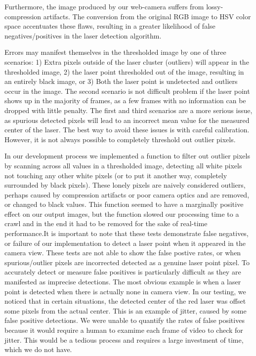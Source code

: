 \documentclass[10pt,twocolumn,letterpaper]{article}
\begin{document}
Furthermore, the image produced by our web-camera suffers from lossy-compression artifacts.  The conversion from the original RGB image to HSV color space accentuates these flaws, resulting in a greater likelihood of false negatives/positives in the laser detection algorithm.

Errors may manifest themselves in the thresholded image by one of three scenarios: 1) Extra pixels outside of the laser cluster (outliers) will appear in the thresholded image, 2) the laser point thresholded out of the image, resulting in an entirely black image, or 3) Both the laser point is undetected and outliers occur in the image.  The second scenario is not difficult problem if the laser point shows up in the majority of frames, as a few frames with no information can be dropped with little penalty.  The first and third scenarios are a more serious issue, as spurious detected pixels will lead to an incorrect mean value for the measured center of the laser.  The best way to avoid these issues is with careful calibration.  However, it is not always possible to completely threshold out outlier pixels.

In our development process we implemented a function to filter out outlier pixels by scanning across all values in a thresholded image, detecting all white pixels not touching any other white pixels (or to put it another way, completely surrounded by black pixels).  These lonely pixels are naively considered outliers, perhaps caused by compression artifacts or poor camera optics and are removed, or changed to black values.  This function seemed to have a marginally positive effect on our output images, but the function slowed our processing time to a crawl and in the end it had to be removed for the sake of real-time performance.It is important to note that these tests demonstrate false negatives, or failure of our implementation to detect a laser point when it appeared in the camera view.  These tests are not able to show the false postive rates, or when spurious/outlier pixels are incorrected detected as a genuine laser point pixel.  To accurately detect or measure false positives is particularly difficult as they are manifested as imprecise detections.  The most obvious example is when a laser point is detected when there is actually none in camera view.  In our testing, we noticed that in certain situations, the detected center of the red laser was offset some pixels from the actual center.  This is an example of jitter, caused by some false positive detections.  We were unable to quantify the rates of false positives because it would require a human to examime each frame of video to check for jitter.  This would be a tedious process and requires a large investment of time, which we do not have.
\end{document}
